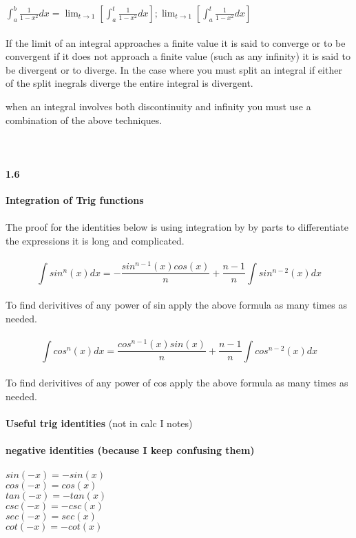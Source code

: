 \documentclass[14pt]{extreport}
\begin{document}
$\int_{a}^{b} \frac{1}{1-x^2}dx = \lim_{t \to 1} [\int_{a}^{t} \frac{1}{1-x^2}dx] ; \lim_{t \to 1} [\int_{a}^{t} \frac{1}{1-x^2}dx]$\\\\

If the limit of an integral approaches a finite value it is said to converge or to be convergent if it does not approach a finite value (such as any infinity) it is said to be divergent or to diverge. In the case where you must split an integral if either of the split inegrals diverge the entire integral is divergent.

when an integral involves both discontinuity and infinity you must use a combination of the above techniques.\\\\\\

\paragraph{1.6}\textbf{Integration of Trig functions}\\\\

The proof for the identities below is using integration by by parts to differentiate the expressions it is long and complicated.\\\\

$$\int sin^n(x)dx = -\frac{sin^{n-1}(x)cos(x)}{n} + \frac{n-1}{n} \int sin^{n-2}(x)dx$$\\
To find derivitives of any power of sin apply the above formula as many times as needed.\\\\

$$\int cos^n(x)dx = \frac{cos^{n-1}(x)sin(x)}{n} + \frac{n-1}{n} \int cos^{n-2}(x)dx$$\\
To find derivitives of any power of cos apply the above formula as many times as needed.\\\\

\textbf{Useful trig identities} (not in calc I notes)\\\\

\textbf{negative identities (because I keep confusing them)}\\\\
$sin(-x) = -sin(x)$\\
$cos(-x) = cos(x)$\\
$tan(-x) = -tan(x)$\\
$csc(-x) = -csc(x)$\\
$sec(-x) = sec(x)$\\
$cot(-x) = -cot(x)$\\\\
\end{document}
